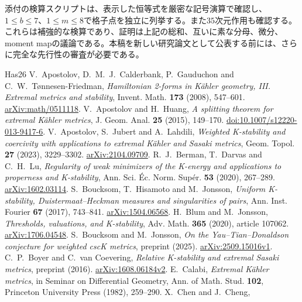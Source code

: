 \documentclass[12pt]{amsart}
\theoremstyle{definition}
\theoremstyle{remark}
\numberwithin{equation}{section}
\begin{document}
添付の検算スクリプトは、表示した恒等式を厳密な記号演算で確認し、$1\leq b\leq7$、$1\leq m\leq8$で格子点を独立に列挙する。また$35$次元作用も確認する。これらは補強的な検算であり、証明は上記の総和、互いに素な分母、微分、moment mapの議論である。本稿を新しい研究論文として公表する前には、さらに完全な先行性の審査が必要である。


\begin{thebibliography}{Has26}
V.~Apostolov, D.~M.~J.~Calderbank, P.~Gauduchon and C.~W.~T{\o}nnesen-Friedman,
\emph{Hamiltonian 2-forms in Kähler geometry, III. Extremal metrics and stability},
Invent. Math. \textbf{173} (2008), 547--601.
\href{https://arxiv.org/abs/math/0511118}{arXiv:math/0511118}.
V.~Apostolov and H.~Huang,
\emph{A splitting theorem for extremal Kähler metrics},
J. Geom. Anal. \textbf{25} (2015), 149--170.
\href{https://doi.org/10.1007/s12220-013-9417-6}{doi:10.1007/s12220-013-9417-6}.
V.~Apostolov, S.~Jubert and A.~Lahdili,
\emph{Weighted K-stability and coercivity with applications to extremal Kähler and Sasaki metrics},
Geom. Topol. \textbf{27} (2023), 3229--3302.
\href{https://arxiv.org/abs/2104.09709}{arXiv:2104.09709}.
R.~J.~Berman, T.~Darvas and C.~H.~Lu,
\emph{Regularity of weak minimizers of the K-energy and applications to properness and K-stability},
Ann. Sci. Éc. Norm. Supér. \textbf{53} (2020), 267--289.
\href{https://arxiv.org/abs/1602.03114}{arXiv:1602.03114}.
S.~Boucksom, T.~Hisamoto and M.~Jonsson,
\emph{Uniform K-stability, Duistermaat--Heckman measures and singularities of pairs},
Ann. Inst. Fourier \textbf{67} (2017), 743--841.
\href{https://arxiv.org/abs/1504.06568}{arXiv:1504.06568}.
H.~Blum and M.~Jonsson,
\emph{Thresholds, valuations, and K-stability},
Adv. Math. \textbf{365} (2020), article 107062.
\href{https://arxiv.org/abs/1706.04548}{arXiv:1706.04548}.
S.~Boucksom and M.~Jonsson,
\emph{On the Yau--Tian--Donaldson conjecture for weighted cscK metrics},
preprint (2025).
\href{https://arxiv.org/abs/2509.15016v1}{arXiv:2509.15016v1}.
C.~P.~Boyer and C.~van Coevering,
\emph{Relative K-stability and extremal Sasaki metrics},
preprint (2016).
\href{https://arxiv.org/abs/1608.06184v2}{arXiv:1608.06184v2}.
E.~Calabi,
\emph{Extremal Kähler metrics},
in Seminar on Differential Geometry, Ann. of Math. Stud. \textbf{102},
Princeton University Press (1982), 259--290.
X.~Chen and J.~Cheng,

\end{thebibliography}
\end{document}
